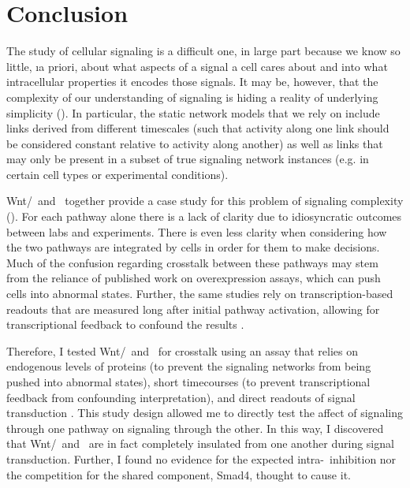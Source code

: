 \chapter{Conclusion}
\label{conclusion:introduction}


The study of cellular signaling is a difficult one, in large
part because we know so little, \i{a priori}, about what aspects
of a signal a cell cares about and into what intracellular properties
it encodes those signals. It may be, however, that the complexity of
our understanding of signaling is hiding a reality of underlying simplicity
(). In particular, the static
network models that we rely on include links derived from
different timescales (such that activity along one link
should be considered constant relative to activity along another)
as well as links that may only be present in a
subset of true signaling network instances
(e.g. in certain cell types or experimental conditions).


Wnt/\bcat\ and \tgfbsf\ together
provide a case study for this problem of signaling
complexity ().
For each pathway alone there is a lack
of clarity due to idiosyncratic outcomes between
labs and experiments. There is even less
clarity when considering how the two pathways are integrated
by cells in order for them to make decisions.
Much of the confusion
regarding crosstalk between these pathways may stem
from the reliance of published work on overexpression assays,
which can push cells into abnormal states. Further,
the same studies rely on transcription-based
readouts that are measured long after initial pathway 
activation, allowing for transcriptional feedback to confound
the results . 


Therefore, I tested Wnt/\bcat\
and \tgfbsf\ for crosstalk using an assay that relies on
endogenous levels of proteins (to prevent the signaling networks
from being pushed into abnormal states), short timecourses
(to prevent transcriptional feedback from confounding 
interpretation), and direct readouts of signal transduction
.
This study design allowed me to directly test the affect
of signaling through one pathway on signaling through the other.
In this way, I discovered that Wnt/\bcat\ and \tgfbsf\ are in fact
completely insulated from one another during signal transduction.
Further, I found no evidence for the expected intra-\tgfbsf\ inhibition
nor the competition for the shared component, Smad4, thought to cause it.


